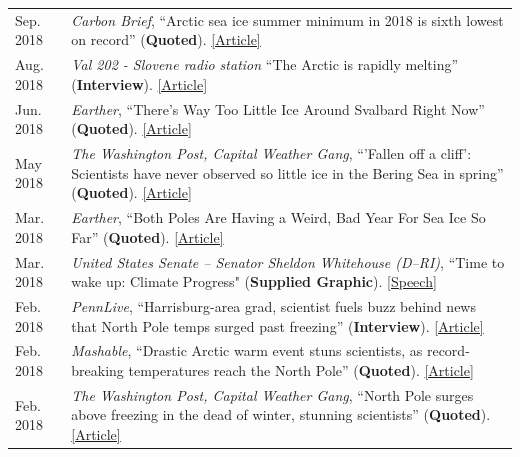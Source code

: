 \documentclass[margin,line,palatino,courier,10pt]{res}
\begin{document}
\begin{resume}
\begin{tabular}{@{}p{0.9in}p{4in}}
\end{tabular}
\begin{tabular}{@{}p{0.9in}p{4in}}
Sep. 2018 & \textit{Carbon Brief}, ``Arctic sea ice summer minimum in 2018 is sixth lowest on record'' (\textbf{Quoted}). \href{https://www.carbonbrief.org/arctic-sea-ice-summer-minimum-in-2018-is-sixth-lowest-on-record}{[Article]}\\
Aug. 2018 & \textit{Val 202 - Slovene radio station} ``The Arctic is rapidly melting'' (\textbf{Interview}). \href{https://val202.rtvslo.si/2018/08/sonce-je-odprlo-zemljin-hladilnik/}{[Article]}\\
Jun. 2018 & \textit{Earther}, ``There's Way Too Little Ice Around Svalbard Right Now'' (\textbf{Quoted}). \href{https://earther.com/theres-way-too-little-ice-around-svalbard-right-now-1826567780}{[Article]}\\
May 2018 & \textit{The Washington Post, Capital Weather Gang}, ``'Fallen off a cliff': Scientists have never observed so little ice in the Bering Sea in spring'' (\textbf{Quoted}). \href{https://www.washingtonpost.com/news/capital-weather-gang/wp/2018/05/03/fallen-off-a-cliff-scientists-have-never-observed-so-little-ice-in-the-bering-sea-in-spring/?noredirect=on&utm_term=.cbcf2781b5e4}{[Article]}\\
Mar. 2018 & \textit{Earther}, ``Both Poles Are Having a Weird, Bad Year For Sea Ice So Far'' (\textbf{Quoted}). \href{https://earther.com/both-poles-are-having-a-weird-bad-year-for-sea-ice-so-1824074352}{[Article]}\\
Mar. 2018 & \textit{United States Senate -- Senator Sheldon Whitehouse (D--RI)}, ``Time to wake up: Climate Progress" (\textbf{Supplied Graphic}). \href{https://www.youtube.com/watch?v=C_E5OQgt2SE}{[Speech]}\\
Feb. 2018 & \textit{PennLive}, ``Harrisburg-area grad, scientist fuels buzz behind news that North Pole temps surged past freezing'' (\textbf{Interview}). \href{http://www.pennlive.com/news/2018/02/harrisburg-area_scientist_is_b.html}{[Article]}\\
Feb. 2018 & \textit{Mashable}, ``Drastic Arctic warm event stuns scientists, as record-breaking temperatures reach the North Pole'' (\textbf{Quoted}). \href{https://mashable.com/2018/02/26/arctic-heat-wave-north-pole-february-sea-ice/?utm_cid=hp-h-2#jZ.Ip1wPjkqD}{[Article]}\\
Feb. 2018 & \textit{The Washington Post, Capital Weather Gang}, ``North Pole surges above freezing in the dead of winter, stunning scientists'' (\textbf{Quoted}). \href{https://www.washingtonpost.com/news/capital-weather-gang/wp/2018/02/26/north-pole-surges-above-freezing-in-the-dead-of-winter-stunning-scientists/?utm_term=.6025384d6bf1}{[Article]}\\

\end{tabular}
\end{resume}
\end{document}
